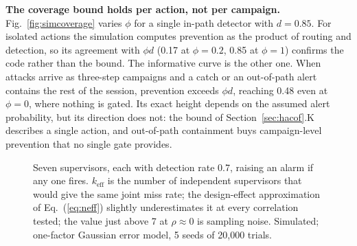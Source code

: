\documentclass[journal]{IEEEtran}
\begin{document}
\textbf{The coverage bound holds per action, not per campaign.} Fig.~\ref{fig:simcoverage} varies $\phi$ for a single in-path detector with $d=0.85$. For isolated actions the simulation computes prevention as the product of routing and detection, so its agreement with $\phi d$ (0.17 at $\phi=0.2$, 0.85 at $\phi=1$) confirms the code rather than the bound. The informative curve is the other one. When attacks arrive as three-step campaigns and a catch or an out-of-path alert contains the rest of the session, prevention exceeds $\phi d$, reaching 0.48 even at $\phi=0$, where nothing is gated. Its exact height depends on the assumed alert probability, but its direction does not: the bound of Section~\ref{sec:hacof}.K describes a single action, and out-of-path containment buys campaign-level prevention that no single gate provides.

\begin{figure}[!t]
\centering
{}
\caption{Seven supervisors, each with detection rate 0.7, raising an alarm if any one fires. $k_{\text{eff}}$ is the number of independent supervisors that would give the same joint miss rate; the design-effect approximation of Eq.~(\ref{eq:neff}) slightly underestimates it at every correlation tested; the value just above 7 at $\rho \approx 0$ is sampling noise. Simulated; one-factor Gaussian error model, 5 seeds of 20{,}000 trials.}
\label{fig:simneff}
\end{figure}
\end{document}
